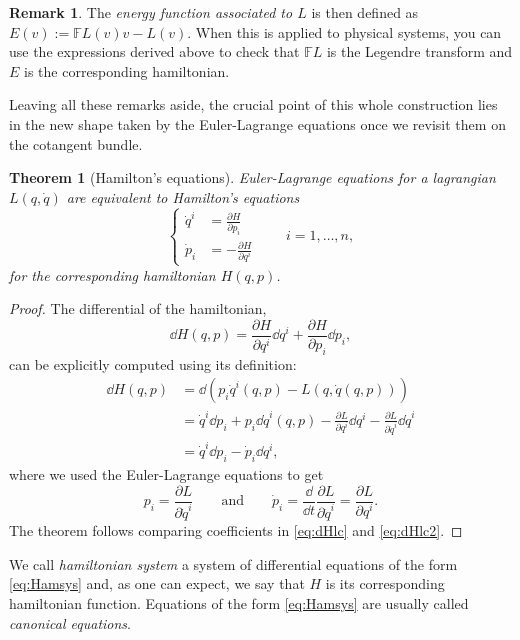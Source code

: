 \documentclass[english,fontsize=11pt,paper=b5]{scrbook}
\newtheorem{theorem}{Theorem}[chapter]
\theoremstyle{definition}
\newtheorem{remark}{Remark}[chapter]
\begin{document}
\begin{remark}
      The \emph{energy function associated to $L$} is then defined as $E(v) := \mathbb{F}L(v) v - L(v)$. When this is applied to physical systems, you can use the expressions derived above to check that $\mathbb{F}L$ is the Legendre transform and $E$ is the corresponding hamiltonian.
    \end{remark}

    Leaving all these remarks aside, the crucial point of this whole construction lies in the new shape taken by the Euler-Lagrange equations once we revisit them on the cotangent bundle.

    \begin{theorem}[Hamilton's equations]\label{thm:Hameqns}
      Euler-Lagrange equations for a lagrangian $L(q,\dot q)$ are equivalent to \emph{Hamilton's equations}
      \begin{equation}\label{eq:Hamsys}
        \left\lbrace
          \begin{aligned}
            \dot q^i & = \frac{\partial H}{\partial p_i}  \\
            \dot p_i & = -\frac{\partial H}{\partial q^i}
          \end{aligned}
        \right. \qquad i=1,\ldots,n,
      \end{equation}
      for the corresponding hamiltonian $H(q,p)$.
    \end{theorem}
    \begin{proof}
      The differential of the hamiltonian,
      \begin{equation}\label{eq:dHlc}
        \dd H(q,p) = \frac{\partial H}{\partial q^i}\dd q^i + \frac{\partial H}{\partial p_i}\dd p_i,
      \end{equation}
      can be explicitly computed using its definition:
      \begin{align}
        \dd H(q,p) & = \dd \left( p_i\dot q^i(q,p) - L(q, \dot q(q,p)) \right)                                                                             \\
                   & = \dot q^i \dd p_i + p_i \dd \dot q^i(q,p) - \frac{\partial L}{\partial q^i} \dd q^i - \frac{\partial L}{\partial \dot q^i} \dd \dot q^i \\
                   & = \dot q^i \dd p_i - \dot p_i \dd q^i, \label{eq:dHlc2}
      \end{align}
      where we used the Euler-Lagrange equations to get
      \begin{equation}
        p_i = \frac{\partial L}{\partial \dot q^i}
        \qquad\mbox{and}\qquad
        \dot p_i = \frac{\dd }{\dd t}\frac{\partial L}{\partial \dot q^i} = \frac{\partial L}{\partial q^i}.
      \end{equation}
      The theorem follows comparing coefficients in \eqref{eq:dHlc} and \eqref{eq:dHlc2}.
    \end{proof}
    We call \emph{hamiltonian system} a system of differential equations of the form \eqref{eq:Hamsys} and, as one can expect, we say that $H$ is its corresponding hamiltonian function. Equations of the form \eqref{eq:Hamsys} are usually called \emph{canonical equations}.
\end{document}
